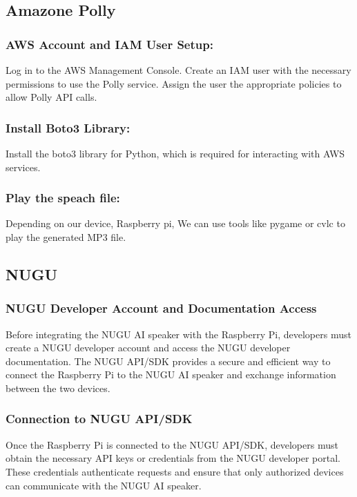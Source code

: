 \subsection{\textbf{Amazone Polly}}
\subsubsection{AWS Account and IAM User Setup:}
Log in to the AWS Management Console.
Create an IAM user with the necessary permissions to use the Polly service. Assign the user the appropriate policies to allow Polly API calls.
\subsubsection{Install Boto3 Library:}
Install the boto3 library for Python, which is required for interacting with AWS services.
\subsubsection{Play the speach file:}
Depending on our device, Raspberry pi, We can use tools like pygame or cvlc to play the generated MP3 file.


\subsection{\textbf{NUGU}}

\subsubsection{\textbf{NUGU Developer Account and Documentation Access}}
Before integrating the NUGU AI speaker with the Raspberry Pi, developers must create a NUGU developer account and access the NUGU developer documentation. 
The NUGU API/SDK provides a secure and efficient way to connect the Raspberry Pi to the NUGU AI speaker and exchange information between the two devices.\\

\subsubsection{\textbf{Connection to NUGU API/SDK}}
Once the Raspberry Pi is connected to the NUGU API/SDK, developers must obtain the necessary API keys or credentials from the NUGU developer portal. These credentials authenticate requests and ensure that only authorized devices can communicate with the NUGU AI speaker.\\

